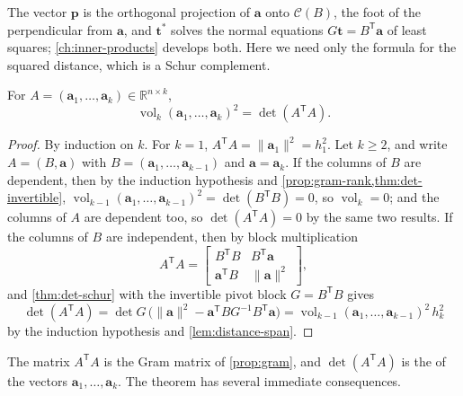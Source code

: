 The vector $\mathbf p$ is the orthogonal projection of $\mathbf a$ onto $\mathcal C(B)$, the foot of the perpendicular from $\mathbf a$, and $\mathbf t^*$ solves the normal equations $G\mathbf t=B^{\mathsf T}\mathbf a$ of least squares; \cref{ch:inner-products} develops both. Here we need only the formula for the squared distance, which is a Schur complement.

\begin{theorem}
\label{thm:gram-determinant}
For $A=(\mathbf a_1,\ldots,\mathbf a_k)\in\mathbb R^{n\times k}$,
\[
\operatorname{vol}_k(\mathbf a_1,\ldots,\mathbf a_k)^2=\det(A^{\mathsf T}A).
\]
\end{theorem}

\begin{proof}
By induction on $k$. For $k=1$, $A^{\mathsf T}A=\|\mathbf a_1\|^2=h_1^2$. Let $k\ge2$, and write $A=(B,\mathbf a)$ with $B=(\mathbf a_1,\ldots,\mathbf a_{k-1})$ and $\mathbf a=\mathbf a_k$. If the columns of $B$ are dependent, then by the induction hypothesis and \cref{prop:gram-rank,thm:det-invertible}, $\operatorname{vol}_{k-1}(\mathbf a_1,\ldots,\mathbf a_{k-1})^2=\det(B^{\mathsf T}B)=0$, so $\operatorname{vol}_k=0$; and the columns of $A$ are dependent too, so $\det(A^{\mathsf T}A)=0$ by the same two results. If the columns of $B$ are independent, then by block multiplication
\[
A^{\mathsf T}A=\begin{bmatrix}B^{\mathsf T}B&B^{\mathsf T}\mathbf a\\\mathbf a^{\mathsf T}B&\|\mathbf a\|^2\end{bmatrix},
\]
and \cref{thm:det-schur} with the invertible pivot block $G=B^{\mathsf T}B$ gives
\[
\det(A^{\mathsf T}A)=\det G\,\bigl(\|\mathbf a\|^2-\mathbf a^{\mathsf T}BG^{-1}B^{\mathsf T}\mathbf a\bigr)=\operatorname{vol}_{k-1}(\mathbf a_1,\ldots,\mathbf a_{k-1})^2\,h_k^2
\]
by the induction hypothesis and \cref{lem:distance-span}.
\end{proof}

The matrix $A^{\mathsf T}A$ is the Gram matrix of \cref{prop:gram}, and $\det(A^{\mathsf T}A)$ is the  of the vectors $\mathbf a_1,\ldots,\mathbf a_k$. The theorem has several immediate consequences.

